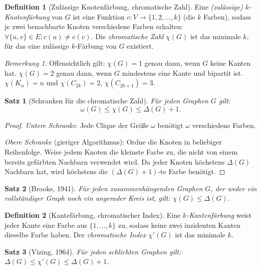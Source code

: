 ﻿\documentclass[a4paper,12pt,openany,oneside]{book}
\theoremstyle{definition}
\newtheorem{definition}{Definition}[chapter]
\theoremstyle{plain}
\newtheorem{satz}{Satz}[chapter]
\theoremstyle{remark}
\newtheorem{bemerkung}{Bemerkung}[chapter]
\begin{document}
\begin{definition}[Zul\"assige Knotenf\"arbung, chromatische Zahl]
  Eine \emph{(zul\"assige) $k$-Knotenf\"arbung} von $G$ ist eine Funktion
  $c: V \to \{1, 2, \ldots, k\}$ (die $k$ Farben), sodass je zwei
  benachbarte Knoten verschiedene Farben erhalten:
  $\forall \{u,v\} \in E: c(u) \neq c(v).$
  Die \emph{chromatische Zahl} $\chi(G)$ ist das minimale $k$, f\"ur das
  eine zul\"assige $k$-F\"arbung von $G$ existiert.
\end{definition}

\begin{bemerkung}
  Offensichtlich gilt: $\chi(G) = 1$ genau dann, wenn $G$ keine Kanten hat.
  $\chi(G) = 2$ genau dann, wenn $G$ mindestens eine Kante und bipartit ist.
  $\chi(K_n) = n$ und $\chi(C_{2k}) = 2$, $\chi(C_{2k+1}) = 3$.
\end{bemerkung}

\begin{satz}[Schranken f\"ur die chromatische Zahl]
  F\"ur jeden Graphen $G$ gilt:
  \[
    \omega(G) \leq \chi(G) \leq \Delta(G) + 1.
  \]
\end{satz}

\begin{proof}
  \emph{Untere Schranke}: Jede Clique der Gr\"o\ss{}e $\omega$ ben\"otigt
  $\omega$ verschiedene Farben.

  \emph{Obere Schranke} (gieriger Algorithmus): Ordne die Knoten in
  beliebiger Reihenfolge. Weise jedem Knoten die kleinste Farbe zu, die
  nicht von einem bereits gef\"arbten Nachbarn verwendet wird. Da jeder
  Knoten h\"ochstens $\Delta(G)$ Nachbarn hat, wird h\"ochstens die
  $(\Delta(G)+1)$-te Farbe ben\"otigt.
\end{proof}

\begin{satz}[Brooks, 1941]
  F\"ur jeden zusammenh\"angenden Graphen $G$, der weder ein vollst\"andiger
  Graph noch ein ungerader Kreis ist, gilt:
  $\chi(G) \leq \Delta(G).$
\end{satz}

\begin{definition}[Kantef\"arbung, chromatischer Index]
  Eine \emph{$k$-Kantenf\"arbung} weist jeder Kante eine Farbe aus
  $\{1,\ldots,k\}$ zu, sodass keine zwei inzidenten Kanten dieselbe Farbe
  haben. Der \emph{chromatische Index} $\chi'(G)$ ist das minimale $k$.
\end{definition}

\begin{satz}[Vizing, 1964]
  F\"ur jeden schlichten Graphen gilt:
  $\Delta(G) \leq \chi'(G) \leq \Delta(G) + 1.$
\end{satz}
\end{document}
